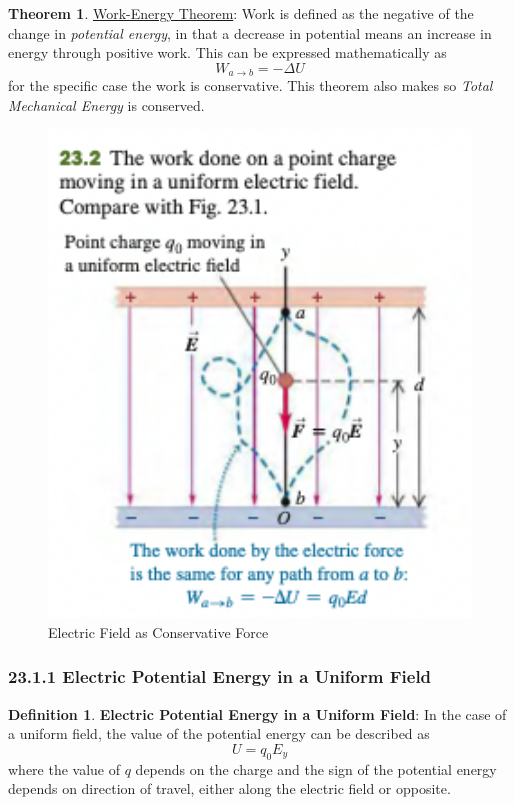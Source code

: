 \documentclass[12pt]{amsart}
\theoremstyle{definition}
\newtheorem{theorem}{Theorem}  %
\newtheorem{definition}{Definition} %
\numberwithin{equation}{theorem}    %
\begin{document}
\begin{theorem}
    \underline{Work-Energy Theorem}: Work is defined as the negative of the
    change in \textit{potential energy}, in that a decrease in potential means an increase
    in energy through positive work. This can be expressed mathematically as 
    $$W_{a \rightarrow b} = -\Delta U$$ for the specific case the work is 
    conservative. This theorem also makes so \textit{Total Mechanical Energy} is conserved.
\end{theorem}

\begin{figure}[H]
    \centering
    \includegraphics[width=5in]{Media/Conservative.png}
    \caption{Electric Field as Conservative Force}
    \label{Electric Field as Conservative Force}
\end{figure}


\subsubsection*{23.1.1 Electric Potential Energy in a Uniform Field}

\begin{definition}
    \textbf{Electric Potential Energy in a Uniform Field}:
    In the case of a uniform field, the value of the potential energy 
    can be described as $$U = q_0 E_y$$ where the value of $q$ depends on the charge
    and the sign of the potential energy depends on direction of travel, either
    along the electric field or opposite.
\end{definition}
\end{document}
